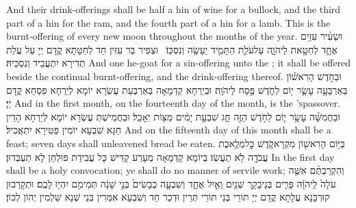 {And their drink-offerings shall be half a hin of wine for a bullock, and the third part of a hin for the ram, and the fourth part of a hin for a lamb. This is the burnt-offering of every new moon throughout the months of the year.}{}
{וּשְׂעִ֨יר עִזִּ֥ים אֶחָ֛ד לְחַטָּ֖את לַיהֹוָ֑ה עַל\maqqaf עֹלַ֧ת הַתָּמִ֛יד יֵעָשֶׂ֖ה וְנִסְכּֽוֹ׃ \setuma }
{וּצְפִיר בַּר עִזִּין חַד לְחַטָּתָא קֳדָם יְיָ עַל עֲלַת תְּדִירָא יִתְעֲבֵיד וְנִסְכֵּיהּ׃}
{And one he-goat for a sin-offering unto the \lord; it shall be offered beside the continual burnt-offering, and the drink-offering thereof.}{}
{וּבַחֹ֣דֶשׁ הָרִאשׁ֗וֹן בְּאַרְבָּעָ֥ה עָשָׂ֛ר י֖וֹם לַחֹ֑דֶשׁ פֶּ֖סַח לַיהֹוָֽה׃}
{וּבְיַרְחָא קַדְמָאָה בְּאַרְבְּעַת עֶשְׂרָא יוֹמָא לְיַרְחָא פִּסְחָא קֳדָם יְיָ׃}
{And in the first month, on the fourteenth day of the month, is the \lord\textsc{’s}\space passover.}{}
{וּבַחֲמִשָּׁ֨ה עָשָׂ֥ר י֛וֹם לַחֹ֥דֶשׁ הַזֶּ֖ה חָ֑ג שִׁבְעַ֣ת יָמִ֔ים מַצּ֖וֹת יֵאָכֵֽל׃}
{וּבַחֲמֵישְׁתְּ עֶשְׂרָא יוֹמָא לְיַרְחָא הָדֵין חַגָּא שִׁבְעָא יוֹמִין פַּטִּירָא יִתְאֲכִיל׃}
{And on the fifteenth day of this month shall be a feast; seven days shall unleavened bread be eaten.}{}
{בַּיּ֥וֹם הָרִאשׁ֖וֹן מִקְרָא\maqqaf קֹ֑דֶשׁ כׇּל\maqqaf מְלֶ֥אכֶת עֲבֹדָ֖ה לֹ֥א תַעֲשֽׂוּ׃}
{בְּיוֹמָא קַדְמָאָה מְעָרַע קַדִּישׁ כָּל עֲבִידַת פּוּלְחַן לָא תַעְבְּדוּן׃}
{In the first day shall be a holy convocation; ye shall do no manner of servile work;}{}
{וְהִקְרַבְתֶּ֨ם אִשֶּׁ֤ה עֹלָה֙ לַֽיהֹוָ֔ה פָּרִ֧ים בְּנֵי\maqqaf בָקָ֛ר שְׁנַ֖יִם וְאַ֣יִל אֶחָ֑ד וְשִׁבְעָ֤ה כְבָשִׂים֙ בְּנֵ֣י שָׁנָ֔ה תְּמִימִ֖ם יִהְי֥וּ לָכֶֽם׃}
{וּתְקָרְבוּן קוּרְבָּנָא עֲלָתָא קֳדָם יְיָ תּוֹרֵי בְּנֵי תּוֹרֵי תְּרֵין וּדְכַר חַד וְשִׁבְעָא אִמְּרִין בְּנֵי שְׁנָא שַׁלְמִין יְהוֹן לְכוֹן׃}

